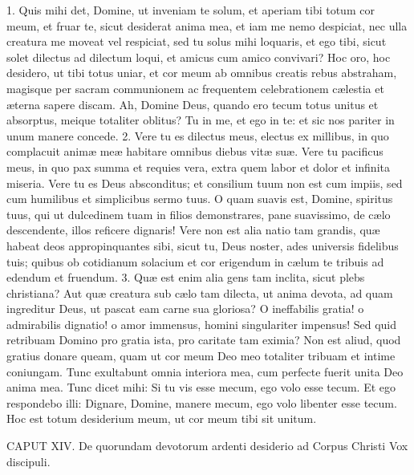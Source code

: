 1. Quis mihi det, Domine, ut inveniam te solum, et aperiam tibi totum cor meum, et fruar te, sicut desiderat anima mea, et iam me nemo despiciat, nec ulla creatura me moveat vel respiciat, sed tu solus mihi loquaris, et ego tibi, sicut solet dilectus ad dilectum loqui, et amicus cum amico convivari? Hoc oro, hoc desidero, ut tibi totus uniar, et cor meum ab omnibus creatis rebus abstraham, magisque per sacram communionem ac frequentem celebrationem cælestia et æterna sapere discam. Ah, Domine Deus, quando ero tecum totus unitus et absorptus, meique totaliter oblitus? Tu in me, et ego in te: et sic nos pariter in unum manere concede.
2. Vere tu es dilectus meus, electus ex millibus, in quo complacuit animæ meæ habitare omnibus diebus vitæ suæ. Vere tu pacificus meus, in quo pax summa et requies vera, extra quem labor et dolor et infinita miseria. Vere tu es Deus absconditus; et consilium tuum non est cum impiis, sed cum humilibus et simplicibus sermo tuus. O quam suavis est, Domine, spiritus tuus, qui ut dulcedinem tuam in filios demonstrares, pane suavissimo, de cælo descendente, illos reficere dignaris! Vere non est alia natio tam grandis, quæ habeat deos appropinquantes sibi, sicut tu, Deus noster, ades universis fidelibus tuis; quibus ob cotidianum solacium et cor erigendum in cælum te tribuis ad edendum et fruendum.
3. Quæ est enim alia gens tam inclita, sicut plebs christiana? Aut quæ creatura sub cælo tam dilecta, ut anima devota, ad quam ingreditur Deus, ut pascat eam carne sua gloriosa? O ineffabilis gratia! o admirabilis dignatio! o amor immensus, homini singulariter impensus! Sed quid retribuam Domino pro gratia ista, pro caritate tam eximia? Non est aliud, quod gratius donare queam, quam ut cor meum Deo meo totaliter tribuam et intime coniungam. Tunc exultabunt omnia interiora mea, cum perfecte fuerit unita Deo anima mea. Tunc dicet mihi: Si tu vis esse mecum, ego volo esse tecum. Et ego respondebo illi: Dignare, Domine, manere mecum, ego volo libenter esse tecum. Hoc est totum desiderium meum, ut cor meum tibi sit unitum.


CAPUT XIV.
De quorundam devotorum ardenti desiderio ad Corpus Christi
Vox discipuli.

